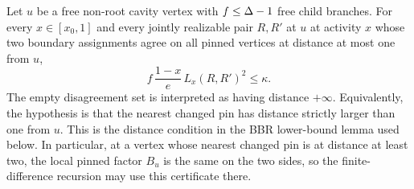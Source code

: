 \begin{lemma}
\label{lem:bbr-certificate}
Let \(u\) be a free non-root cavity vertex with
\(f\le\Delta-1\) free child branches.  For every \(x\in[x_0,1]\) and every
jointly realizable pair \(R,R'\) at \(u\) at activity \(x\) whose two
boundary assignments agree on all pinned vertices at distance at most one
from \(u\),
\begin{equation}
 f\,\frac{1-x}{e}\,L_x(R,R')^2\le\kappa.
 \label{eq:bbr-certificate}
\end{equation}
The empty disagreement set is interpreted as having distance \(+\infty\).
Equivalently, the hypothesis is that the nearest changed pin has distance
strictly larger than one from \(u\).  This is the distance condition in the
BBR lower-bound lemma used below.  In particular, at a vertex whose nearest
changed pin is at distance at least two, the local pinned factor \(B_u\) is
the same on the two sides, so the finite-difference recursion may use this
certificate there.
\end{lemma}

